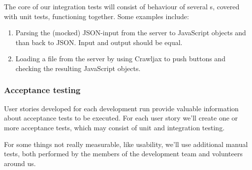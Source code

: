 The core of our integration tests will consist of behaviour of several s, covered with unit tests, functioning together. Some examples include:
\begin{enumerate}
	\item Parsing the (mocked) JSON-input from the server to JavaScript objects and than back to JSON. Input and output should be equal.
	\item Loading a file from the server by using Crawljax to push buttons and checking the resulting JavaScript objects.
\end{enumerate}

\subsubsection{Acceptance testing}
User stories developed for each development run provide valuable information about acceptance tests to be executed. For each user story we'll create one or more acceptance tests, which may consist of unit and integration testing.

For some things not really measurable, like usability, we'll use additional manual tests, both performed by the members of the development team and volunteers around us.
